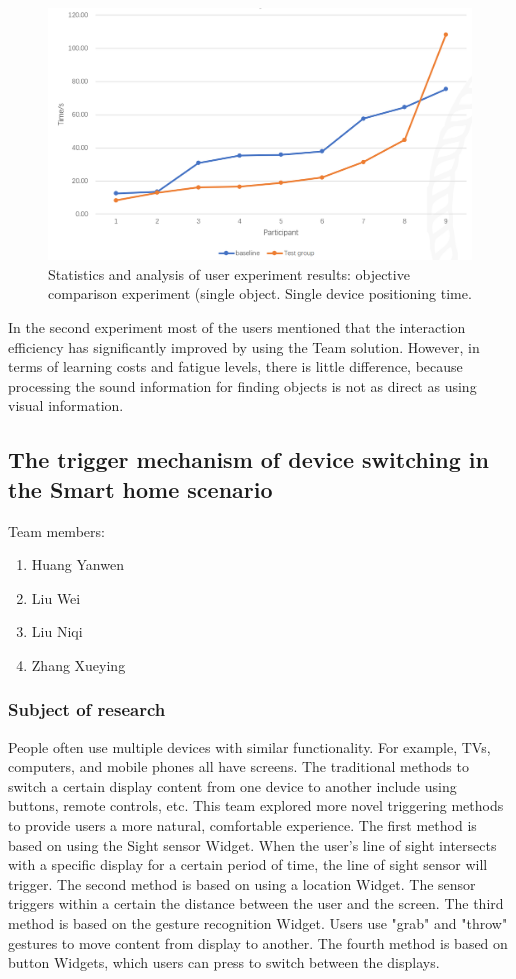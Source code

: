 \begin{figure}
  \centering
  \includegraphics[width=0.9\linewidth]{figures/Project_1.png}
  \caption{Statistics and analysis of user experiment results: objective comparison experiment (single object. Single device positioning time.}
  \label{fig:Project1-figure}
\end{figure}

In the second experiment most of the users mentioned that the interaction efficiency has significantly improved by using the Team solution. However, in terms of learning costs and fatigue levels, there is little difference, because processing the sound information for finding objects is not as direct as using visual information. 

\subsection{The trigger mechanism of device switching in the Smart home scenario}

Team members:
\begin{enumerate}
    \item Huang Yanwen 
    \item Liu Wei 
    \item Liu Niqi 
    \item Zhang Xueying 
\end{enumerate}

\subsubsection{Subject of research}

People often use multiple devices with similar functionality. For example, TVs, computers, and mobile phones all have screens. The traditional methods to switch a certain display content from one device to another include using buttons, remote controls, etc. This team explored more novel triggering methods to provide users a more natural, comfortable experience.
The first method is based on using the Sight sensor Widget. When the user's line of sight intersects with a specific display for a certain period of time, the line of sight sensor will trigger.
The second method is based on using a location Widget. The sensor triggers within a certain the distance between the user and the screen.
The third method is based on the gesture recognition Widget. Users use "grab" and "throw" gestures to move content from display to another. 
The fourth method is based on button Widgets, which users can press to switch between the displays.

